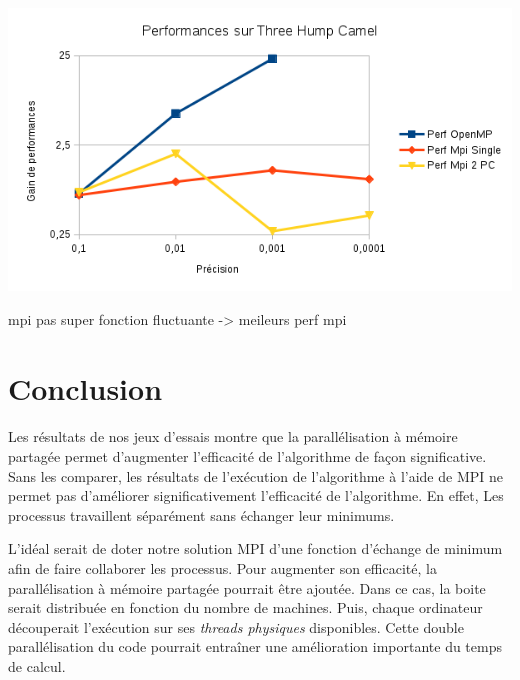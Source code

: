 \documentclass[a4paper]{article}
\begin{document}
\begin{center}
\includegraphics[scale=0.7]{graph_thc.png}
\end{center}

mpi pas super
fonction fluctuante -> meileurs perf mpi

\paragraph{}
    
\section{Conclusion}
    \paragraph{}
    Les résultats de nos jeux d'essais montre que la parallélisation à mémoire partagée permet d'augmenter l'efficacité de l'algorithme de façon significative. Sans les comparer, les résultats de l'exécution de l'algorithme à l'aide de MPI ne permet pas d'améliorer significativement l'efficacité de l'algorithme. En effet, Les processus travaillent séparément sans échanger leur minimums.
    
    L'idéal serait de doter notre solution MPI d'une fonction d’échange de minimum afin de faire collaborer les processus. Pour augmenter son efficacité, la parallélisation à mémoire partagée pourrait être ajoutée. Dans ce cas, la boite serait distribuée en fonction du nombre de machines. Puis, chaque ordinateur découperait l'exécution sur ses \emph{threads physiques} disponibles. Cette double parallélisation du code pourrait entraîner une amélioration importante du temps de calcul.
    
    
\end{document}
